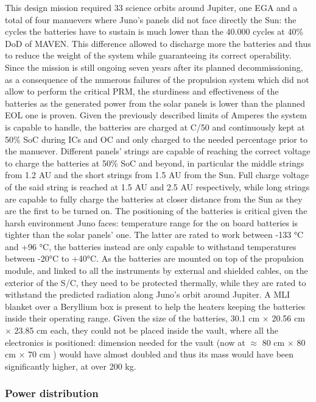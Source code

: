 This design mission required 33 science orbits around Jupiter, one EGA and a total of four manuevers where Juno's panels did not face directly the Sun: the cycles the batteries have to sustain is much lower than the 40.000 cycles at 40\% DoD of MAVEN. This difference allowed to discharge more the batteries and thus to reduce the weight of the system while guaranteeing its correct operability. Since the mission is still ongoing seven years after its planned decommissioning, as a consequence of the numerous failures of the propulsion system which did not allow to perform the critical PRM, the sturdiness and effectiveness of the batteries as the generated power from the solar panels is lower than the planned EOL one is proven. Given the previously described limits of Amperes the system is capable to handle, the batteries are charged at C/50 and continuously kept at 50\% SoC during ICs and OC and only charged to the needed percentage prior to the manuever. Different panels' strings are capable of reaching the correct voltage to charge the batteries at 50\% SoC and beyond, in particular the middle strings from 1.2 AU and the short strings from 1.5 AU from the Sun. Full charge voltage of the said string is reached at 1.5 AU and 2.5 AU respectively, while long strings are capable to fully charge the batteries at closer distance from the Sun as they are the first to be turned on.\cite{solar_panels_coef} The positioning of the batteries is critical given the harsh environment Juno faces: temperature range for the on board batteries is tighter than the solar panels' one. The latter are rated to work between -133 °C and +96 °C, the batteries instead are only capable to withstand temperatures between -20°C to +40°C. As the batteries are mounted on top of the propulsion module, and linked to all the instruments by external and shielded cables, on the exterior of the S/C, they need to be protected thermally, while they are rated to withstand the predicted radiation along Juno's orbit around Jupiter.\cite{batteries_position} A MLI blanket over a Beryllium box is present to help the heaters keeping the batteries inside their operating range. Given the size of the batteries, 30.1 cm $\times$ 20.56 cm $\times$ 23.85 cm each, they could not be placed inside the vault, where all the electronics is positioned: dimension needed for the vault (now at  $\approx$ 80 cm $\times$ 80 cm $\times$ 70 cm ) would have almost doubled and thus its mass would have been significantly higher, at over 200 kg.\cite{batteries_position}

\subsubsection{Power distribution}
\label{subsec: pwr_distribution}

